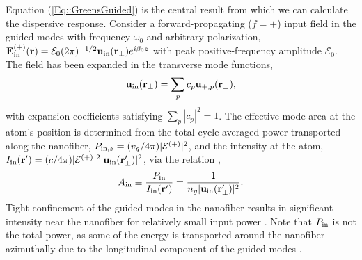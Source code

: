 \documentclass[preprint,aps,pra,onecolumn]{revtex4-1} %
\newcommand{\inp}{{\rm in}}
\newcommand{\fwd}{+}
\begin{document}
Equation (\ref{Eq::GreensGuided}) is the central result from which we can calculate the dispersive response.  Consider a forward-propagating ($f=+$) input field in the guided modes with frequency $\omega_0$ and arbitrary polarization, $\mathbf{E}^{(+)}_{\inp}(\br) = \mathcal{E}_0 (2\pi)^{-1/2} \mathbf{u}_{\rm in}(\br_\perp) e^{i \beta_0 z}$ with peak positive-frequency amplitude $\mathcal{E}_0$. The field has been expanded in the transverse mode functions,
	\begin{align} \label{Eq::uin}
		\mbf{u}_{\rm in}(\mbf{r}_\perp) = \sum_{p} c_{p} \mathbf{u}_{\fwd,p}(\br_\perp),
	\end{align}
with expansion coefficients satisfying $\sum_{p} |c_{p}|^2 = 1$.  The effective mode area at the atom's position is determined from the total cycle-averaged power transported along the nanofiber, $P_{{\rm in},z} = (v_g/4\pi) |\mathcal{E}^{(+)}|^2$, and the intensity at the atom, $I_{\rm in}(\mathbf{r}') = (c/4\pi)|\mathcal{E}^{(+)}|^2|\mathbf{u}_{\rm in}(\mathbf{r}_\perp')|^2$, via the relation \cite{domokos_quantum_2002},
 	\begin{align} \label{Eq::AreaIn}
 		A_{\rm in} \equiv \frac{P_{{\rm in}}}{I_{\rm in}(\mathbf{r}')} = \frac{1}{n_g |\mathbf{u}_{\rm in}(\mathbf{r}'_\perp)|^{2}}.
	\end{align}
Tight confinement of the guided modes in the nanofiber results in significant intensity near the nanofiber for relatively small input power \cite{bures_power_1999}.  Note that $P_{\rm in}$ is not the total power, as some of the energy is transported around the nanofiber azimuthally due to the longitudinal component of the guided modes \cite{le_kien_scattering_2006}.
\end{document}
